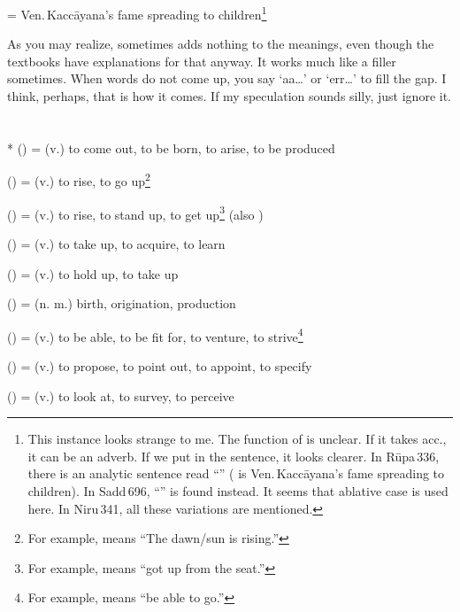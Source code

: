 \begin{compactitem}
\item {} = Ven.\,Kacc\=ayana's fame spreading to children\footnote{This instance looks strange to me. The function of  is unclear. If it takes acc., it can be an adverb. If we put  in the sentence, it looks clearer. In R\=upa\,336, there is an analytic sentence read ``'' ( is Ven.\,Kacc\=ayana's fame spreading to children). In Sadd\,696, ``'' is found instead. It seems that ablative case is used here. In Niru\,341, all these variations are mentioned.}
\end{compactitem}

As you may realize, sometimes  adds nothing to the meanings, even though the textbooks have explanations for that anyway. It works much like a filler sometimes. When words do not come up, you say `aa\dots' or `err\dots' to fill the gap. I think, perhaps, that is how it comes. If my speculation sounds silly, just ignore it.

\section*{}\label{upasagga:u}
\begin{compactitem}
\item {}* () = (v.) to come out, to be born, to arise, to be produced
\item {} () = (v.) to rise, to go up\footnote{For example,  means ``The dawn/sun is rising.''}
\item {} () = (v.) to rise, to stand up, to get up\footnote{For example,  means ``got up from the seat.''} (also )
\item {} () = (v.) to take up, to acquire, to learn
\item {} () = (v.) to hold up, to take up 
\item {} () = (n. m.) birth, origination, production 
\item {} () = (v.) to be able, to be fit for, to venture, to strive\footnote{For example,  means ``be able to go.''}
\item {} () = (v.) to propose, to point out, to appoint, to specify
\item {} () = (v.) to look at, to survey, to perceive 
\end{compactitem}

